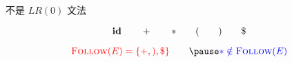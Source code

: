 






\begin{frame}
  \begin{columns}
      
  \end{columns}

  \begin{center}
    不是 $LR(0)$ 文法 \pause \qquad {}
  \end{center}
\end{frame}

\begin{frame}
  \[
    \id \qquad + \qquad \ast \qquad ( \qquad ) \qquad \$
  \]

  

  \pause
  \[
    \red{\follow(E) = \set{+, ), \$}} \qquad \pause \blue{\ast \notin \follow(E)}
  \]
\end{frame}
